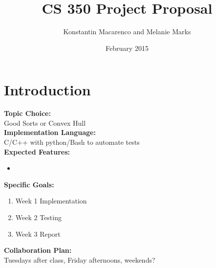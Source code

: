 \documentclass{article}
\title{CS 350 Project Proposal}
\author{Konstantin Macarenco and Melanie Marks }
\date{February 2015}
\begin{document}
\maketitle


%



\section{Introduction}
\textbf{Topic Choice:}\\
Good Sorts or Convex Hull\\
\textbf{Implementation Language:}\\
C/C++ with python/Bash to automate tests\\
\textbf{Expected Features:} 
\begin{itemize}
\item 
\end{itemize}
\textbf{Specific Goals:} \\
\begin{enumerate}
\item Week 1  Implementation\\
\item Week 2  Testing \\
\item Week 3  Report \\
\end{enumerate}
\textbf{Collaboration Plan: }\\
Tuesdays after class, Friday afternoons, weekends?
\end{document}
